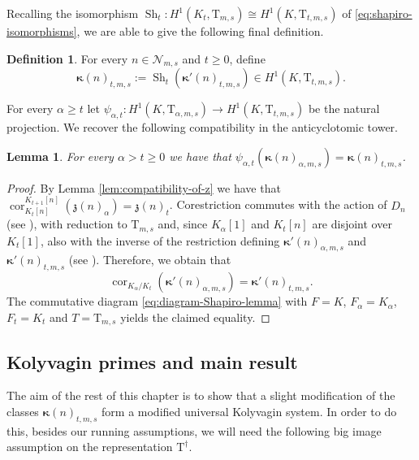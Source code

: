 \documentclass[12pt,reqno]{amsart}
\newtheorem{lemma}[theorem]{Lemma}
\theoremstyle{definition}
\newtheorem{definition}[theorem]{Definition}
\theoremstyle{remark}
\newcommand{\T}{\boldsymbol{\mathrm{T}}}
\DeclareMathOperator{\sh}{Sh}
\DeclareMathOperator{\Cor}{cor}
\newcommand{\ga}{\alpha}
\newcommand{\gk}{\kappa}
\begin{document}
Recalling the isomorphism $\sh_t\colon H^1(K_t,\T_{m,s})\cong H^1(K,\T_{t,m,s})$ of \eqref{eq:shapiro-isomorphisms}, we are able to give the following final definition. 

\begin{definition}
    For every $n\in\mathcal{N}_{m,s}$ and $t\ge 0$, define
    \begin{equation*}
            \boldsymbol{\gk}(n)_{t,m,s}:=\sh_t(\boldsymbol{\gk}'(n)_{t,m,s})\in H^1(K,\T_{t,m,s}).
    \end{equation*}
\end{definition}

For every $\ga\ge t$ let $\psi_{\ga,t}\colon H^1(K,\T_{\ga,m,s})\to H^1(K,\T_{t,m,s})$ be the natural projection. We recover the following compatibility in the anticyclotomic tower.

    \begin{lemma}\label{lem:vertical-compatibility-kn}
	    For every $\ga> t\ge 0$ we have that $\psi_{\ga,t}(\boldsymbol{\gk}(n)_{\ga,m,s})=\boldsymbol{\gk}(n)_{t,m,s}$.
	\end{lemma}
	\begin{proof}
		By Lemma \ref{lem:compatibility-of-z} we have that $\Cor_{K_{t}[n]}^{K_{t+1}[n]}(\mathfrak{z}(n)_{\ga})=\mathfrak{z}(n)_{t}$. Corestriction commutes with the action of $D_n$ (see \cite[Proposition 1.5.4]{Neukirch-Schmidt-Wingberg:cohomology-of-number-fields}), with reduction to $\T_{m,s}$ and, since $K_\ga[1]$ and $K_t[n]$ are disjoint over $K_t[1]$, also with the inverse of the restriction defining $\boldsymbol{\gk}'(n)_{\ga,m,s}$ and  $\boldsymbol{\gk}'(n)_{t,m,s}$ (see \cite[Corollary 1.5.8]{Neukirch-Schmidt-Wingberg:cohomology-of-number-fields}). Therefore, we obtain that
        \begin{equation*}
            \Cor_{K_\ga/K_t}(\boldsymbol{\gk}'(n)_{\ga,m,s})=\boldsymbol{\gk}'(n)_{t,m,s}.
        \end{equation*}
        The commutative diagram \eqref{eq:diagram-Shapiro-lemma} with $F=K$, $F_\ga=K_\ga$, $F_t=K_t$ and $T=\T_{m,s}$ yields the claimed equality.
\end{proof}

\subsection{Kolyvagin primes and main result}\label{sec:kolyvagin-primes-and-main-result}

The aim of the rest of this chapter is to show that a slight modification of the classes $\boldsymbol{\gk}(n)_{t,m,s}$ form a modified universal Kolyvagin system. In order to do this, besides our running assumptions, we will need the following big image assumption on the representation $\T^{\dag}$. 
\end{document}
